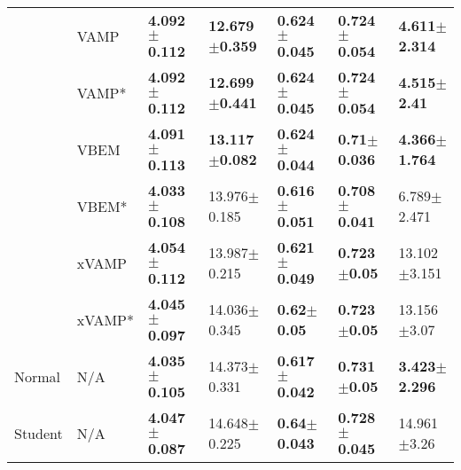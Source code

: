 \begin{tabular}{lllllll}
        & VAMP &  \textbf{4.092$\pm$0.112} &  \textbf{12.679$\pm$0.359} &  \textbf{0.624$\pm$0.045} &  \textbf{0.724$\pm$0.054} &  \textbf{4.611$\pm$2.314} \\
        & VAMP* &  \textbf{4.092$\pm$0.112} &  \textbf{12.699$\pm$0.441} &  \textbf{0.624$\pm$0.045} &  \textbf{0.724$\pm$0.054} &   \textbf{4.515$\pm$2.41} \\
        & VBEM &  \textbf{4.091$\pm$0.113} &  \textbf{13.117$\pm$0.082} &  \textbf{0.624$\pm$0.044} &   \textbf{0.71$\pm$0.036} &  \textbf{4.366$\pm$1.764} \\
        & VBEM* &  \textbf{4.033$\pm$0.108} &           13.976$\pm$0.185 &  \textbf{0.616$\pm$0.051} &  \textbf{0.708$\pm$0.041} &           6.789$\pm$2.471 \\
        & xVAMP &  \textbf{4.054$\pm$0.112} &           13.987$\pm$0.215 &  \textbf{0.621$\pm$0.049} &   \textbf{0.723$\pm$0.05} &          13.102$\pm$3.151 \\
        & xVAMP* &  \textbf{4.045$\pm$0.097} &           14.036$\pm$0.345 &    \textbf{0.62$\pm$0.05} &   \textbf{0.723$\pm$0.05} &           13.156$\pm$3.07 \\
Normal & N/A &  \textbf{4.035$\pm$0.105} &           14.373$\pm$0.331 &  \textbf{0.617$\pm$0.042} &   \textbf{0.731$\pm$0.05} &  \textbf{3.423$\pm$2.296} \\
Student & N/A &  \textbf{4.047$\pm$0.087} &           14.648$\pm$0.225 &   \textbf{0.64$\pm$0.043} &  \textbf{0.728$\pm$0.045} &           14.961$\pm$3.26 \\
\bottomrule
\end{tabular}

